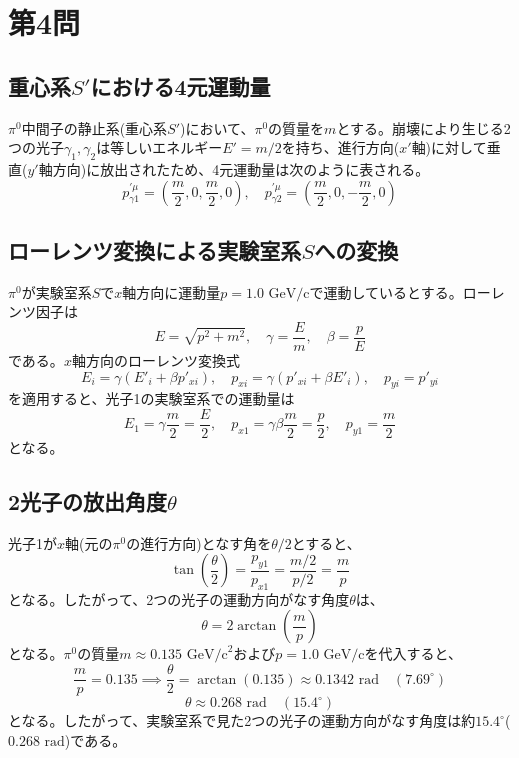 \documentclass[autodetect-engine,11pt,a4paper]{bxjsarticle}
\begin{document}
\section*{第4問}

\subsection*{重心系$S'$における4元運動量}
$\pi^0$中間子の静止系(重心系$S'$)において、$\pi^0$の質量を$m$とする。崩壊により生じる2つの光子$\gamma_1, \gamma_2$は等しいエネルギー$E' = m/2$を持ち、進行方向($x'$軸)に対して垂直($y'$軸方向)に放出されたため、4元運動量は次のように表される。
\[
p_{\gamma 1}^{\prime \mu} = \left( \frac{m}{2}, 0, \frac{m}{2}, 0 \right), \quad p_{\gamma 2}^{\prime \mu} = \left( \frac{m}{2}, 0, -\frac{m}{2}, 0 \right)
\]

\subsection*{ローレンツ変換による実験室系$S$への変換}
$\pi^0$が実験室系$S$で$x$軸方向に運動量$p = 1.0\text{ GeV/c}$で運動しているとする。ローレンツ因子は
\[
E = \sqrt{p^2 + m^2}, \quad \gamma = \frac{E}{m}, \quad \beta = \frac{p}{E}
\]
である。$x$軸方向のローレンツ変換式
\[
E_i = \gamma (E'_i + \beta p'_{xi}), \quad p_{xi} = \gamma (p'_{xi} + \beta E'_i), \quad p_{yi} = p'_{yi}
\]
を適用すると、光子1の実験室系での運動量は
\[
E_1 = \gamma \frac{m}{2} = \frac{E}{2}, \quad p_{x1} = \gamma \beta \frac{m}{2} = \frac{p}{2}, \quad p_{y1} = \frac{m}{2}
\]
となる。

\subsection*{2光子の放出角度$\theta$}
光子1が$x$軸(元の$\pi^0$の進行方向)となす角を$\theta/2$とすると、
\[
\tan\left(\frac{\theta}{2}\right) = \frac{p_{y1}}{p_{x1}} = \frac{m/2}{p/2} = \frac{m}{p}
\]
となる。したがって、2つの光子の運動方向がなす角度$\theta$は、
\[
\theta = 2 \arctan\left(\frac{m}{p}\right)
\]
となる。$\pi^0$の質量$m \approx 0.135\text{ GeV/c}^2$および$p = 1.0\text{ GeV/c}$を代入すると、
\[
\frac{m}{p} = 0.135 \implies \frac{\theta}{2} = \arctan(0.135) \approx 0.1342\text{ rad} \quad (7.69^\circ)
\]
\[
\theta \approx 0.268\text{ rad} \quad (15.4^\circ)
\]
となる。したがって、実験室系で見た2つの光子の運動方向がなす角度は約$15.4^\circ$($0.268\text{ rad}$)である。
\end{document}
